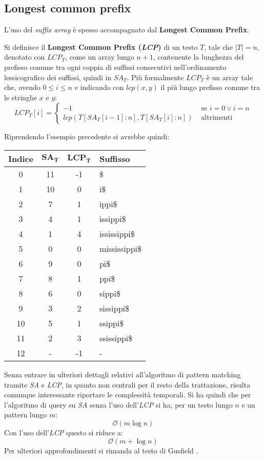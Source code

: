 \subsection{Longest common prefix}
L'uso del \textit{suffix array} è spesso accompagnato dal \textbf{Longest Common
  Prefix}.
\begin{definizione}
  Si definisce il \textbf{Longest Common Prefix (\emph{LCP})} di un testo $T$,
  tale che $|T|=n$,
  denotato con $LCP_T$, come un array lungo $n+1$, contenente la
  lunghezza del prefisso comune tra ogni coppia di suffissi consecutivi
  nell'ordinamento lessicografico dei suffissi, quindi in $SA_T$. Più formalmente
  $LCP_T$ è un array tale che, avendo $0\leq i\leq n$ e indicando con $lcp(x,y)$
  il più lungo prefisso comune tra le stringhe $x$ e $y$:
  \[LCP_T[i]=
    \begin{cases}
      -1&\mbox{ se } i=0 \lor i=n\\
      lcp(T[SA_T[i-1]: n],T[SA_T [i]: n])&\mbox{ altrimenti}
    \end{cases}
  \]
\end{definizione}
\begin{esempio}
  Riprendendo l'esempio precedente si avrebbe quindi:
  \begin{table}[H]
    \centering
    \footnotesize
    \begin{tabular}{c|c|c|l} 
      \textbf{Indice} & $\mathbf{SA_T}$ & $\mathbf{LCP_T}$ & \textbf{Suffisso}\\ 
      \hline
      0 & 11 & -1 & \$\\
      1 & 10 & 0 & i\$\\
      2 & 7 & 1 & ippi\$\\
      3 & 4 & 1 & issippi\$\\
      4 & 1 & 4 & ississippi\$\\
      5 & 0 & 0 & mississippi\$\\
      6 & 9 & 0 & pi\$\\
      7 & 8 & 1 & ppi\$\\
      8 & 6 & 0 & sippi\$\\
      9 & 3 & 2 & sissippi\$\\
      10 & 5 & 1 & ssippi\$\\
      11 & 2 & 3 & ssissippi\$\\
      12 & - & -1 & -
    \end{tabular}
  \end{table}
\end{esempio}
Senza entrare in ulteriori dettagli relativi all'algoritmo di pattern matching
tramite \textit{SA} e \textit{LCP}, in quanto non centrali per il resto della
trattazione, risulta comunque interessante riportare le complessità
temporali. Si ha quindi che per l'algoritmo di query su \textit{SA} senza l'uso
dell'\textit{LCP} si ha, per un testo lungo $n$ e un pattern lungo $m$:
\[\mathcal{O}(m\log n)\]
Con l'uso dell'\textit{LCP} questo si riduce a:
\[\mathcal{O}(m+\log n)\]
Per ulteriori approfondimenti si rimanda al testo di Gusfield
\cite{gusfield1997}.
